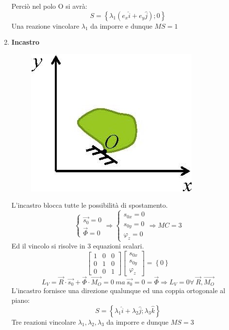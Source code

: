 \documentclass{article}
\begin{document}
\begin{adjustwidth}{2in}{}
\begin{enumerate}
Perciò nel polo O si avrà:
\[
S = \left\lbrace \lambda_{1} (e_{x}\hat{i} + e_{y}\hat{j});0\right\rbrace 
\]
Una reazione vincolare $\lambda_{1}$ da imporre e dunque $MS = 1$
\newpage
\item \textbf{Incastro}\newline
\begin{figure}[H]
	\centering
	\includegraphics[width=0.25\linewidth]{"immagini/1.PARTE1_Pagina_35"}
\end{figure}
L'incastro blocca tutte le possibilità di spostamento. 
\[ 
\begin{cases}
\vec{s_{0}} = 0 \\
\vec{\Phi} = 0
\end{cases}
 \Rightarrow \begin{cases} s_{0x}= 0 \\
 	 s_{0y}= 0\\
 	 \varphi_{z} = 0 
 	 \end{cases}\Rightarrow MC = 3
\]
Ed il vincolo si risolve in 3 equazioni scalari. 
	\[ 
 \left[\begin{array}{ccc}
	1 & 0 & 0 \\
	0 & 1 & 0 \\
	0 & 0 & 1
\end{array}\right] \left[ \begin{array}{c}
	s_{0x} \\
	s_{0y} \\
	\varphi_{z}
\end{array}\right] = \left\lbrace 0 \right\rbrace
\]
\[
L_{V} = \vec{R} \cdot \vec{s_{0}}  + \vec{\Phi} \cdot \vec{M_{O}} = 0 ~ ma ~ \vec{s_{0}} = 0 = \vec{\Phi} \Rightarrow L_{V} = 0 \forall ~ \vec{R}, \vec{M_{O}}
\]
L'incastro fornisce una direzione qualunque ed una coppia ortogonale al piano:
\[
S = \left\lbrace \lambda_{1}\hat{i} + \lambda_{2}\hat{j}; \lambda_{3}\hat{k} \right\rbrace 
\]
Tre reazioni vincolare $\lambda_{1}, \lambda_{2}, \lambda_{3}$ da imporre e dunque $MS = 3$



\end{enumerate}
\end{adjustwidth}
\end{document}
